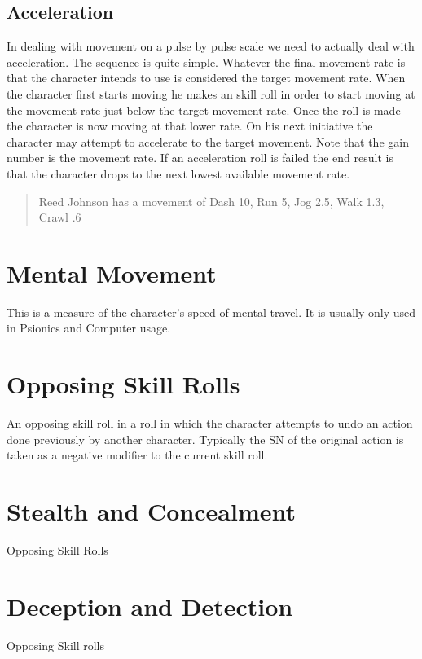 
\subsection{Acceleration}


In dealing with movement on a pulse by pulse scale we need to actually
deal with acceleration. The sequence is quite simple. Whatever the
final movement  rate is that the character intends to use is considered
the target movement rate. When the character first starts moving he
makes an skill roll in order to start moving at the movement
rate just below the target movement rate. Once the roll is made the
character is now moving at that lower rate. On his next  initiative the
character may attempt to accelerate to the target movement. Note  that
the gain number is the movement rate. If an acceleration roll is failed
the end result is that the character drops to the next lowest available
movement  rate. 

\begin{quotation}
Reed Johnson has a movement of Dash 10, Run 5, Jog 2.5, Walk 1.3, Crawl .6
\end{quotation}



\section{Mental Movement}
This is a measure of the character's speed of mental travel. It is 
usually only used in Psionics and Computer usage.

\section{Opposing Skill Rolls}

An opposing skill roll in a roll in which the character attempts to 
undo an action done previously by another character. Typically the SN 
of the original action is taken as a negative modifier to the current 
skill roll.

\section{Stealth and Concealment}

Opposing Skill Rolls

\section{Deception and Detection}

Opposing Skill rolls




